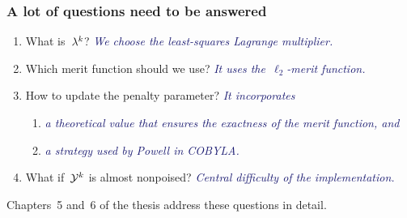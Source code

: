 \documentclass{polyu-presentation}
\newcommand{\lm}[1][]{\lambda\ifthenelse{\equal{#1}{}}{}{^{#1}}}
\newcommand{\xpt}[1][]{\mathcal{Y}\ifthenelse{\equal{#1}{}}{}{^{#1}}}
\begin{document}
\begin{frame}
    \frametitle{A lot of questions need to be answered}

    \begin{enumerate}
        \item What is~$\lm[k]$? 
        \textcolor{MidnightBlue}{\textit{We choose the least-squares Lagrange multiplier.}}
        \item Which merit function should we use? 
        \textcolor{MidnightBlue}{\textit{It uses the~$\ell_2$-merit function.}}
        \item How to update the penalty parameter? 
        \textcolor{MidnightBlue}{\textit{It incorporates}}
        \begin{enumerate}
            \item \textcolor{MidnightBlue}{\textit{a theoretical value that ensures the exactness of the merit function, and}}
            \item \textcolor{MidnightBlue}{\textit{a strategy used by Powell in COBYLA.}}
        \end{enumerate}
        \item What if~$\xpt[k]$ is almost nonpoised?
        \textcolor{MidnightBlue}{\textit{Central difficulty of the implementation.}}
    \end{enumerate}

    \medskip

    \begin{center}
    \end{center}

    \medskip

    Chapters~5 and~6 of the thesis address these questions in detail.
\end{frame}
\end{document}
